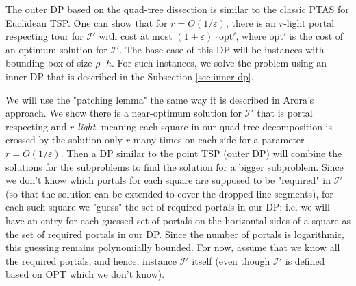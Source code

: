 \documentclass[pdflatex,sn-mathphys-num]{sn-jnl}
\theoremstyle{thmstyleone}
\newcommand{\eps}{\varepsilon}
\newcommand{\opt}{{\text{opt}}}
\newcommand{\OPT}{{\text{OPT}}}
\begin{document}
The outer DP based on the quad-tree dissection is similar to the classic PTAS for Euclidean TSP.
One can show that for $r=O(1/\eps)$, there is an $r$-light portal respecting tour for $\mathcal I'$ with cost
at most $(1+\eps)\cdot\opt'$, where $\opt'$ is the cost of an optimum solution for $\mathcal I'$. 
The base case of this DP will be instances with bounding box of size $\rho\cdot h$. For such instances,
we solve the problem using an inner DP that is described in the Subsection \ref{sec:inner-dp}.

We will use the "patching lemma" the same way it is described in Arora's approach. We show there is a near-optimum solution for $\mathcal I'$ that is
portal respecting and {\em $r$-light}, meaning each square in our quad-tree decomposition is crossed by the solution only $r$ many times on each side for a parameter $r=O(1/\eps)$. Then a DP similar to the point TSP (outer DP) will combine the solutions for the subproblems to find the solution for a bigger subproblem.
Since we don't know which portals for each square are supposed to be "required" in $\mathcal I'$ (so that the solution can be extended to cover the dropped line segments), for each such square we "guess" the set of required portals in our DP; i.e. we will have an entry for each guessed set of portals on the horizontal sides of a square as the set of required portals in our DP. Since the number of portals is logarithmic, this guessing remains polynomially bounded. For now, assume that we know all the required portals, and hence,
instance $\mathcal I'$ itself (even though $\mathcal I'$ is defined based on $\OPT$ which we don't know).
\end{document}
